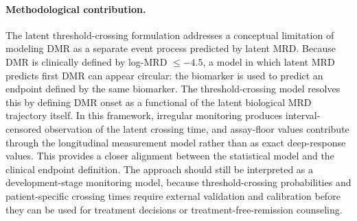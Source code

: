 \paragraph{Methodological contribution.}
The latent threshold-crossing formulation addresses a conceptual limitation of modeling DMR as a separate event process predicted by latent MRD. Because DMR is clinically defined by log-MRD \(\leq -4.5\), a model in which latent MRD predicts first DMR can appear circular: the biomarker is used to predict an endpoint defined by the same biomarker. The threshold-crossing model resolves this by defining DMR onset as a functional of the latent biological MRD trajectory itself. In this framework, irregular monitoring produces interval-censored observation of the latent crossing time, and assay-floor values contribute through the longitudinal measurement model rather than as exact deep-response values. This provides a closer alignment between the statistical model and the clinical endpoint definition. The approach should still be interpreted as a development-stage monitoring model, because threshold-crossing probabilities and patient-specific crossing times require external validation and calibration before they can be used for treatment decisions or treatment-free-remission counseling.
